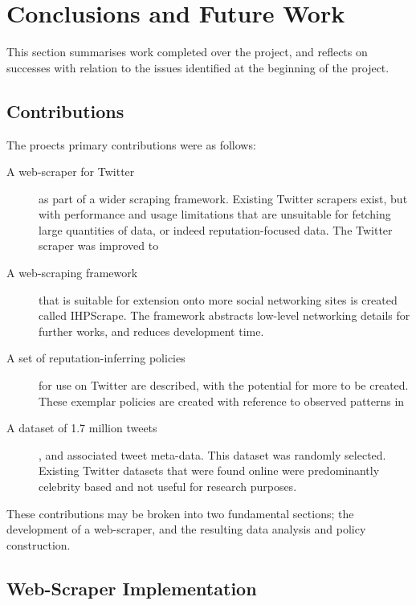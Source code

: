 \chapter{Conclusions and Future Work}\label{C:us}



This section summarises work completed over the project, and reflects on successes with relation to the issues identified at the beginning of the project.

\section{Contributions}
The proects primary contributions were as follows:

\begin{description}
	\item [A web-scraper for Twitter] as part of a wider scraping framework. Existing Twitter scrapers exist, but with performance and usage limitations that are unsuitable for fetching large quantities of data, or indeed reputation-focused data. The Twitter scraper was improved to 
	
	\item [A web-scraping framework] that is suitable for extension onto more social networking sites is created called IHPScrape. The framework abstracts low-level networking details for further works, and reduces development time.
	
	\item [A set of reputation-inferring policies] for use on Twitter are described, with the potential for more to be created. These exemplar policies are created with reference to observed patterns in 
	
	\item [A dataset of 1.7 million tweets], and associated tweet meta-data. This dataset was randomly selected. Existing Twitter datasets that were found online were predominantly celebrity based and not useful for research purposes. 
\end{description}

These contributions may be broken into two fundamental sections; the development of a web-scraper, and the resulting data analysis and policy construction.


\section{Web-Scraper Implementation}

